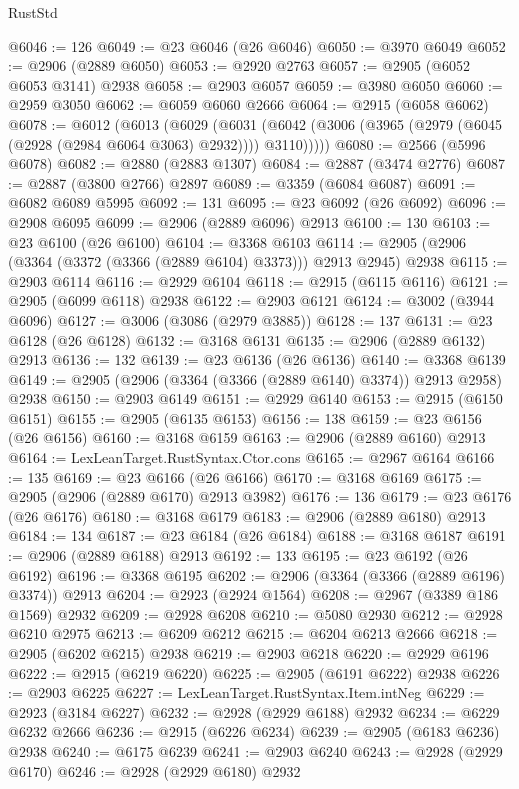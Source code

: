 \begin{lexlean}{RustStd}
\begin{coremodule}
@6046 := 126
@6049 := @23 @6046 (@26 @6046)
@6050 := @3970 @6049
@6052 := @2906 (@2889 @6050)
@6053 := @2920 @2763
@6057 := @2905 (@6052 @6053 @3141) @2938
@6058 := @2903 @6057
@6059 := @3980 @6050
@6060 := @2959 @3050
@6062 := @6059 @6060 @2666
@6064 := @2915 (@6058 @6062)
@6078 := @6012
    (@6013
      (@6029
        (@6031 (@6042 (@3006 (@3965 (@2979 (@6045 (@2928 (@2984 @6064 @3063) @2932)))) @3110)))))
@6080 := @2566 (@5996 @6078)
@6082 := @2880 (@2883 @1307)
@6084 := @2887 (@3474 @2776)
@6087 := @2887 (@3800 @2766) @2897
@6089 := @3359 (@6084 @6087)
@6091 := @6082 @6089 @5995
@6092 := 131
@6095 := @23 @6092 (@26 @6092)
@6096 := @2908 @6095
@6099 := @2906 (@2889 @6096) @2913
@6100 := 130
@6103 := @23 @6100 (@26 @6100)
@6104 := @3368 @6103
@6114 := @2905 (@2906 (@3364 (@3372 (@3366 (@2889 @6104) @3373))) @2913 @2945) @2938
@6115 := @2903 @6114
@6116 := @2929 @6104
@6118 := @2915 (@6115 @6116)
@6121 := @2905 (@6099 @6118) @2938
@6122 := @2903 @6121
@6124 := @3002 (@3944 @6096)
@6127 := @3006 (@3086 (@2979 @3885))
@6128 := 137
@6131 := @23 @6128 (@26 @6128)
@6132 := @3168 @6131
@6135 := @2906 (@2889 @6132) @2913
@6136 := 132
@6139 := @23 @6136 (@26 @6136)
@6140 := @3368 @6139
@6149 := @2905 (@2906 (@3364 (@3366 (@2889 @6140) @3374)) @2913 @2958) @2938
@6150 := @2903 @6149
@6151 := @2929 @6140
@6153 := @2915 (@6150 @6151)
@6155 := @2905 (@6135 @6153)
@6156 := 138
@6159 := @23 @6156 (@26 @6156)
@6160 := @3168 @6159
@6163 := @2906 (@2889 @6160) @2913
@6164 := LexLeanTarget.RustSyntax.Ctor.cons
@6165 := @2967 @6164
@6166 := 135
@6169 := @23 @6166 (@26 @6166)
@6170 := @3168 @6169
@6175 := @2905 (@2906 (@2889 @6170) @2913 @3982)
@6176 := 136
@6179 := @23 @6176 (@26 @6176)
@6180 := @3168 @6179
@6183 := @2906 (@2889 @6180) @2913
@6184 := 134
@6187 := @23 @6184 (@26 @6184)
@6188 := @3168 @6187
@6191 := @2906 (@2889 @6188) @2913
@6192 := 133
@6195 := @23 @6192 (@26 @6192)
@6196 := @3368 @6195
@6202 := @2906 (@3364 (@3366 (@2889 @6196) @3374)) @2913
@6204 := @2923 (@2924 @1564)
@6208 := @2967 (@3389 @186 @1569) @2932
@6209 := @2928 @6208
@6210 := @5080 @2930
@6212 := @2928 @6210 @2975
@6213 := @6209 @6212
@6215 := @6204 @6213 @2666
@6218 := @2905 (@6202 @6215) @2938
@6219 := @2903 @6218
@6220 := @2929 @6196
@6222 := @2915 (@6219 @6220)
@6225 := @2905 (@6191 @6222) @2938
@6226 := @2903 @6225
@6227 := LexLeanTarget.RustSyntax.Item.intNeg
@6229 := @2923 (@3184 @6227)
@6232 := @2928 (@2929 @6188) @2932
@6234 := @6229 @6232 @2666
@6236 := @2915 (@6226 @6234)
@6239 := @2905 (@6183 @6236) @2938
@6240 := @6175 @6239
@6241 := @2903 @6240
@6243 := @2928 (@2929 @6170)
@6246 := @2928 (@2929 @6180) @2932

\end{coremodule}
\end{lexlean}
